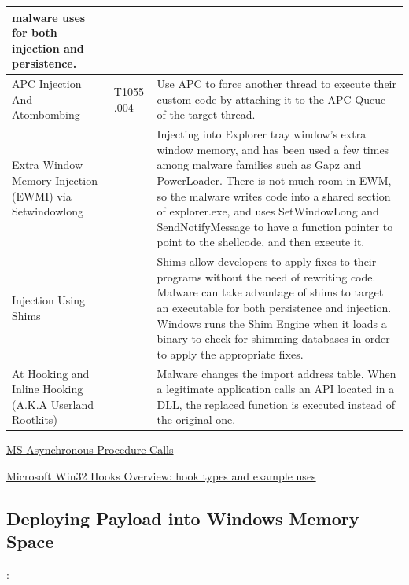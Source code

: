 \documentclass{article}
\begin{document}
\begin{table}[h!]
\begin{tabular}{ |p{3.5cm}||p{1.2cm}|p{10cm}|  }
               malware uses for both injection and persistence. \\
  \hline
  APC Injection And Atombombing
        & T1055 .004
             & Use APC to force another thread to execute their custom code by attaching it to the APC
               Queue of the target thread. \\
  \hline
  Extra Window Memory Injection (EWMI) via Setwindowlong
        &
             & Injecting into Explorer tray window’s extra window memory, and has been used a few times
               among malware families such as Gapz and PowerLoader. There is not much room in EWM, so the
               malware writes code into a shared section of explorer.exe, and uses SetWindowLong and
               SendNotifyMessage to have a function pointer to point to the shellcode, and then execute it. \\
  \hline
  Injection Using Shims
        &
             & Shims allow developers to apply fixes to their programs without the need of rewriting code.
               Malware can take advantage of shims to target an executable for both persistence and injection.
               Windows runs the Shim Engine when it loads a binary to check for shimming databases in order
              to apply the appropriate fixes. \\
  \hline
  At Hooking and Inline Hooking (A.K.A Userland Rootkits)
        &
            & Malware changes the import address table. When a legitimate application calls an API located
              in a DLL, the replaced function is executed instead of the original one. \\

  \hline
\end{tabular}
\label{table: ProcessInjectionTechniques}
\end{table}

\pagebreak

\href{https://learn.microsoft.com/en-gb/windows/win32/sync/asynchronous-procedure-calls}{MS Asynchronous Procedure Calls}

\href{https://learn.microsoft.com/en-gb/windows/win32/winmsg/about-hooks}{Microsoft Win32 Hooks Overview: hook types and example uses}

\subsection{Deploying Payload into Windows Memory Space}

\textbf{}: \textcite{Zhan:2018}
\end{document}
